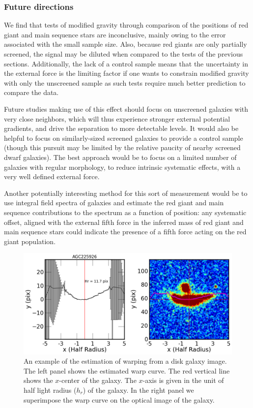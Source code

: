 \documentclass{emulateapj}
\begin{document}
\subsubsection{Future directions}
We find that tests of modified gravity through
comparison of the positions of red giant and main sequence stars
are inconclusive, mainly owing to the error associated with the
small sample size.  Also, because red giants are only
partially screened, the signal may be diluted when compared to
the tests of the previous sections.
Additionally, the lack of a control sample means that
the uncertainty in the external force is the limiting factor
if one wants to constrain modified gravity with only the unscreened sample as
such tests require much better prediction to compare the data. 

Future studies making use of this effect should focus on unscreened galaxies
with very close neighbors, which will thus experience stronger external
potential gradients, and drive the separation to more detectable levels.
It would also be helpful to focus on similarly-sized screened galaxies to
provide a control sample (though this pursuit may be limited by the relative
paucity of nearby screened dwarf galaxies).  
The best approach would be to focus on a limited number of galaxies with
regular morphology, to reduce intrinsic systematic effects, with a very well defined
external force.

Another potentially interesting method 
for this sort of measurement would be to use integral field
spectra of galaxies and estimate the red giant and main sequence contributions
to the spectrum as a function of position: any systematic offset, aligned with
the external fifth force in the inferred mass of red giant and main sequence
stars could indicate the presence of a fifth force acting on the red giant
population.



\begin{figure}
\begin{center}
  \includegraphics[scale=0.5]{figures/AGC225926-warp-curve.png}
\caption{An example of the estimation of warping from a disk galaxy image. 
The left panel shows the estimated warp curve. The red
vertical line shows the $x$-center of the galaxy. The $x$-axis is given in the unit
of half light radius ($h_r$) of the galaxy. In the right panel we superimpose
the warp curve on the optical image of the galaxy. %
}
\label{warp-eg}
\end{center}
\end{figure}
\end{document}
